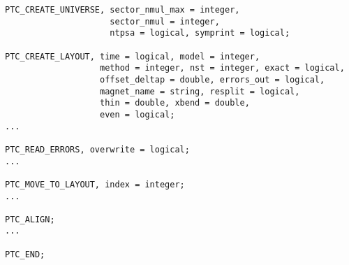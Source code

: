 

\begin{verbatim}
PTC_CREATE_UNIVERSE, sector_nmul_max = integer,
                     sector_nmul = integer, 
                     ntpsa = logical, symprint = logical;

PTC_CREATE_LAYOUT, time = logical, model = integer,
                   method = integer, nst = integer, exact = logical,
                   offset_deltap = double, errors_out = logical,
                   magnet_name = string, resplit = logical, 
                   thin = double, xbend = double, 
                   even = logical;
...

PTC_READ_ERRORS, overwrite = logical;
...

PTC_MOVE_TO_LAYOUT, index = integer;
...

PTC_ALIGN;
...

PTC_END;
\end{verbatim}


